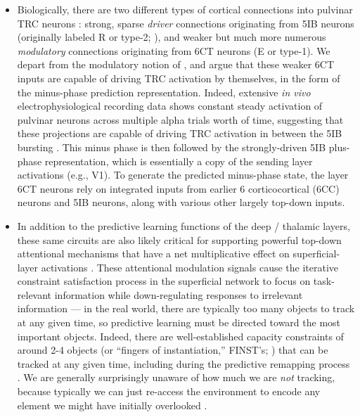 \documentclass[11pt,twoside]{article}
\newif\myifpdf
\begin{document}
\begin{itemize}
\item Biologically, there are two different types of cortical connections into pulvinar TRC neurons \cite{ShermanGuillery06}: strong, sparse {\em driver} connections originating from 5IB neurons (originally labeled R or type-2; ), and weaker but much more numerous {\em modulatory} connections originating from 6CT neurons (E or type-1).  We depart from the modulatory notion of , and argue that these weaker 6CT inputs are capable of driving TRC activation by themselves, in the form of the minus-phase prediction representation.  Indeed, extensive {\em in vivo} electrophysiological recording data shows constant steady activation of pulvinar neurons across multiple alpha trials worth of time, suggesting that these projections are capable of driving TRC activation in between the 5IB bursting \cite{Bender82,PetersenRobinsonKeys85,BenderYouakim01,Robinson93,SaalmannPinskWangEtAl12,KomuraNikkuniHirashimaEtAl13}.  This minus phase is then followed by the strongly-driven 5IB plus-phase representation, which is essentially a copy of the sending layer activations (e.g., V1).  To generate the predicted minus-phase state, the layer 6CT neurons rely on integrated inputs from earlier 6 corticocortical (6CC) neurons and 5IB neurons, along with various other largely top-down inputs.  

\item In addition to the predictive learning functions of the deep / thalamic layers, these same circuits are also likely critical for supporting powerful top-down attentional mechanisms that have a net multiplicative effect on superficial-layer activations \cite{BortoneOlsenScanziani14,OlsenBortoneAdesnikEtAl12,BortoneOlsenScanziani14,OlsenBortoneAdesnikEtAl12}.  These attentional modulation signals cause the iterative constraint satisfaction process in the superficial network to focus on task-relevant information while down-regulating responses to irrelevant information --- in the real world, there are typically too many objects to track at any given time, so predictive learning must be directed toward the most important objects.  Indeed, there are well-established capacity constraints of around 2-4 objects (or ``fingers of instantiation,'' FINST's; ) that can be tracked at any given time, including during the predictive remapping process \cite{CavanaghHuntAfrazEtAl10}.  We are generally surprisingly unaware of how much we are {\em not} tracking, because typically we can just re-access the environment to encode any element we might have initially overlooked \cite{SimonsRensink05}.


\end{itemize}
\end{document}
